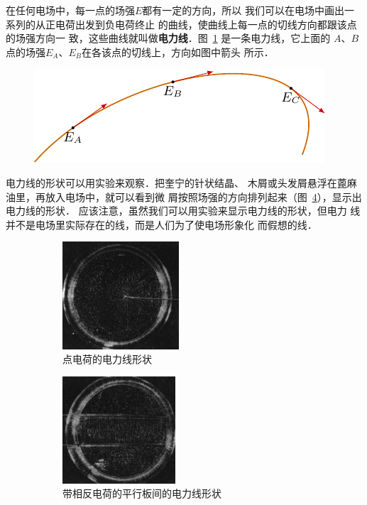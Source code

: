在任何电场中，每一点的场强$E$都有一定的方向，所以
我们可以在电场中画出一系列的从正电荷出发到负电荷终止
的曲线，使曲线上每一点的切线方向都跟该点的场强方向一
致，这些曲线就叫做\textbf{电力线}．图~\ref{fig_B_6-7} 是一条电力线，它上面的
$A$、$B$点的场强$E_A$、$E_B$在各该点的切线上，方向如图中箭头
所示．
\begin{figure}[htbp]
    \centering
    \includegraphics{fig/B/6-7.pdf}
    \caption{}\label{fig_B_6-7}
\end{figure}

电力线的形状可以用实验来观察．把奎宁的针状结晶、
木屑或头发屑悬浮在蓖麻油里，再放入电场中，就可以看到微
屑按照场强的方向排列起来（图~\ref{fig_B_6-8}），显示出电力线的形状．
应该注意，虽然我们可以用实验来显示电力线的形状，但电力
线并不是电场里实际存在的线，而是人们为了使电场形象化
而假想的线．
\begin{figure}[htbp]\centering
    \begin{subfigure}{0.4\linewidth}
        \centering
        \includegraphics[height=4cm]{fig/B/6-8a.jpg}
        \caption{点电荷的电力线形状}\label{fig_B_6-8a}
    \end{subfigure}
    \hfil
    \begin{subfigure}{0.4\linewidth}
        \centering
        \includegraphics[height=4cm]{fig/B/6-8b.jpg}
        \caption{带相反电荷的平行板间的电力线形状}\label{fig_B_6-8b}
    \end{subfigure}
    \caption{}\label{fig_B_6-8}
\end{figure}

